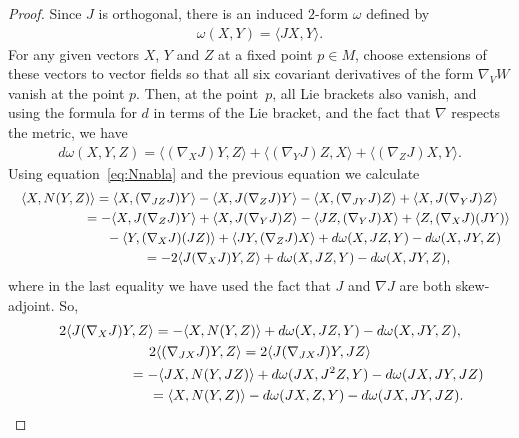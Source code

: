 \documentclass[pdftex]{sigma}
\numberwithin{equation}{section}
\begin{document}
\begin{proof}Since $J$ is orthogonal, there is an induced $2$-form $\omega$ defined by
\begin{gather*}
\omega(X,Y) = \langle JX, Y \rangle.
\end{gather*}
For any given vectors $X$, $Y$ and $Z$ at a fixed point $p \in M$, choose extensions of these vectors to vector fields so that
 all six covariant derivatives of the form $\nabla_V W$ vanish at the point $p$. Then, at the point~$p$, all Lie brackets also vanish, and using the formula for $d$ in terms of the Lie bracket, and the fact that $\nabla$ respects the metric, we have
\begin{gather*}
d \omega (X,Y,Z) = \langle ( \nabla_X J ) Y, Z\rangle + \langle ( \nabla_Y J ) Z, X \rangle + \langle ( \nabla_Z J ) X, Y\rangle .
\end{gather*}
Using equation~\eqref{eq:Nnabla} and the previous equation we calculate
\begin{gather*}
\langle X, N(Y,Z) \rangle =
\langle X, ( \nabla_{JZ} J) Y\rangle - \langle X, J ( \nabla_Z J ) Y\rangle
 - \langle X, ( \nabla_{JY} J) Z\rangle
 + \langle X, J( \nabla_Y J) Z\rangle \\
\hphantom{\langle X, N(Y,Z) \rangle}{} = - \langle X, J ( \nabla_Z J ) Y\rangle + \langle X, J ( \nabla_Y J ) Z\rangle
 - \langle JZ, ( \nabla_{Y} J ) X\rangle + \langle Z, ( \nabla_{X} J ) (JY)\rangle \\
\hphantom{\langle X, N(Y,Z) \rangle=}{}
 - \langle Y, ( \nabla_{X} J ) (JZ)\rangle + \langle JY, ( \nabla_{Z} J ) X\rangle
 + d \omega (X,JZ,Y) - d \omega (X,JY,Z)\\
\hphantom{\langle X, N(Y,Z) \rangle}{}
= - 2 \langle J ( \nabla_X J ) Y, Z \rangle + d \omega (X,JZ,Y) - d \omega (X,JY,Z),
\end{gather*}
where in the last equality we have used the fact that $J$ and $\nabla J$ are both skew-adjoint. So,
\begin{gather*}
2 \langle J ( \nabla_X J ) Y, Z \rangle = -\langle X, N(Y,Z) \rangle + d \omega (X,JZ,Y) - d \omega (X,JY,Z), \\
2 \langle ( \nabla_{JX} J ) Y, Z \rangle = 2 \langle J ( \nabla_{JX} J ) Y, JZ \rangle \\
\hphantom{2 \langle ( \nabla_{JX} J ) Y, Z \rangle}{}
= -\langle JX, N(Y,JZ) \rangle + d \omega (JX,J^2Z,Y) - d \omega (JX,JY,JZ) \\
\hphantom{2 \langle ( \nabla_{JX} J ) Y, Z \rangle}{} = \langle X, N(Y,Z) \rangle - d \omega (JX,Z,Y) - d \omega (JX,JY,JZ).

\end{gather*}
\end{proof}
\end{document}
